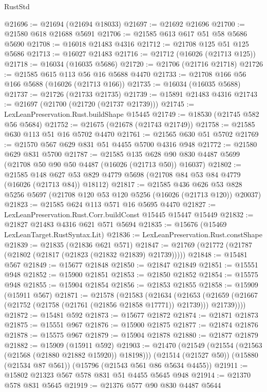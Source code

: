 \begin{lexlean}{RustStd}
\begin{coremodule}
@21696 := @21694 (@21694 @18033)
@21697 := @21692 @21696
@21700 := @21580 @618 @21688 @5691
@21706 := @21585 @613 @617 @51 @58 @5686 @5690
@21708 := @16018 @21483 @4316
@21712 := @21708 @125 @51 @125 @5686
@21713 := @16027 @21483
@21716 := @21712 (@16026 (@21713 @125))
@21718 := @16034 (@16035 @5686)
@21720 := @21706 (@21716 @21718)
@21726 := @21585 @615 @113 @56 @16 @5688 @4470
@21733 := @21708 @166 @56 @166 @5688 (@16026 (@21713 @166))
@21735 := @16034 (@16035 @5688)
@21737 := @21726 (@21733 @21735)
@21739 := @15891 @21483 @4316
@21743 := @21697 (@21700 (@21720 (@21737 @21739)))
@21745 := LexLeanPreservation.Rust.buildShape @15445
@21749 := @18530 (@21745 @582 @56 @5684)
@21752 := @21675 (@21678 (@21743 @21749))
@21758 := @21585 @630 @113 @51 @16 @5702 @4470
@21761 := @21565 @630 @51 @5702
@21769 := @21570 @567 @629 @831 @51 @4455 @5700 @4316 @948
@21772 := @21580 @629 @831 @5700
@21787 := @21585
    @135
    @628
    @90
    @830
    @4487
    @5699
    (@21708 @50 @90 @50 @4487 (@16026 (@21713 @50)) @16037)
@21802 := @21585
    @148
    @627
    @53
    @829
    @4779
    @5698
    (@21708 @84 @53 @84 @4779 (@16026 (@21713 @84)) @18112)
@21817 := @21585
    @436
    @626
    @53
    @828
    @5256
    @5697
    (@21708 @120 @53 @120 @5256 (@16026 (@21713 @120)) @20037)
@21823 := @21585 @624 @113 @571 @16 @5695 @4470
@21827 := LexLeanPreservation.Rust.Corr.buildConst @15445 @15447 @15449
@21832 := @21827 @21483 @4316 @621 @571 @5694
@21835 := @15676 (@15469 LexLeanTarget.RustSyntax.Lit)
@21836 := LexLeanPreservation.Rust.constShape
@21839 := @21835 (@21836 @621 @571)
@21847 := @21769 (@21772 (@21787 (@21802 (@21817 (@21823 (@21832 @21839) @21739)))))
@21848 := @15481 @567
@21849 := @15677 @21848
@21850 := @21847 @21849
@21851 := @15551 @948
@21852 := @15900 @21851
@21853 := @21850 @21852
@21854 := @15575 @948
@21855 := @15904 @21854
@21856 := @21853 @21855
@21858 := @15909 (@15911 @567)
@21871 := @21578
    (@21583
      (@21634
        (@21653 (@21659 (@21667 (@21752 (@21758 (@21761 (@21856 @21858 @17771)) @21739))) @21739))))
@21872 := @15481 @592
@21873 := @15677 @21872
@21874 := @21871 @21873
@21875 := @15551 @967
@21876 := @15900 @21875
@21877 := @21874 @21876
@21878 := @15575 @967
@21879 := @15904 @21878
@21880 := @21877 @21879
@21882 := @15909 (@15911 @592)
@21903 := @21470
    (@21549 (@21554 (@21563 (@21568 (@21880 @21882 @15920)) @18198)))
    (@21514 (@21527 @50))
    (@15880 (@21534 @87 @561))
    (@15796 (@21543 @561 @86 @5634 @4455))
@21911 := @15802 @21323 @567 @578 @831 @51 @4455 @5645 @948
@21914 := @21370 @578 @831 @5645
@21919 := @21376 @577 @90 @830 @4487 @5644

\end{coremodule}
\end{lexlean}
